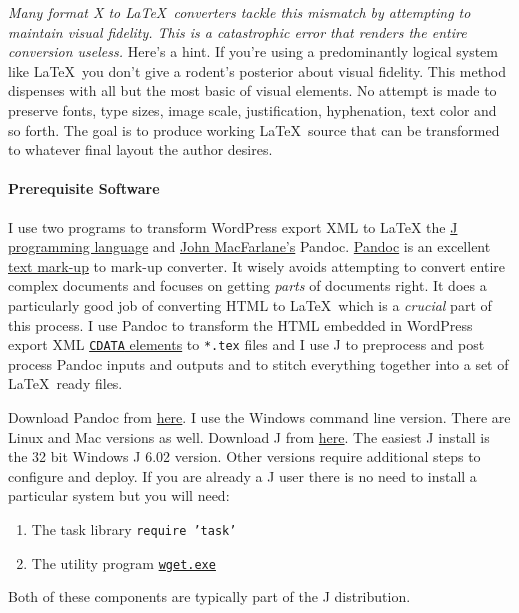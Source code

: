 \emph{Many format X to \LaTeX\ converters tackle this mismatch by
attempting to maintain visual fidelity. This is a catastrophic error
that renders the entire conversion useless.} Here's a hint. If you're
using a predominantly logical system like \LaTeX\ you don't give a
rodent's posterior about visual fidelity. This method dispenses with all
but the most basic of visual elements. No attempt is made to preserve
fonts, type sizes, image scale, justification, hyphenation, text color
and so forth. The goal is to produce working \LaTeX\ source that can be
transformed to whatever final layout the author desires.

\paragraph{Prerequisite Software}

I use two programs to transform WordPress export XML to \LaTeX\: the
\href{http://www.jsoftware.com/}{J programming language} and
\href{http://johnmacfarlane.net/}{John MacFarlane's} Pandoc.
\href{http://johnmacfarlane.net/pandoc/}{Pandoc} is an excellent
\href{http://en.wikipedia.org/wiki/Markup\_language}{text mark-up} to
mark-up converter. It wisely avoids attempting to convert entire complex
documents and focuses on getting \emph{parts} of documents right. It
does a particularly good job of converting HTML to \LaTeX\ which is a
\emph{crucial} part of this process. I use Pandoc to transform the HTML
embedded in WordPress export XML
\href{http://en.wikipedia.org/wiki/CDATA}{\texttt{CDATA} elements} to
\texttt{*.tex} files and I use J to preprocess and post process Pandoc
inputs and outputs and to stitch everything together into a set of \LaTeX\
ready files.

Download Pandoc from
\href{http://johnmacfarlane.net/pandoc/installing.html}{here}. I use the
Windows command line version. There are Linux and Mac versions as well.
Download J from \href{http://www.jsoftware.com/stable.htm}{here}. The
easiest J install is the 32 bit Windows J 6.02 version. Other versions
require additional steps to configure and deploy. If you are already a J
user there is no need to install a particular system but you will need:

\begin{enumerate}
\item
  The task library \texttt{require 'task'}
\item
  The utility program
  \href{http://www.gnu.org/software/wget/}{\texttt{wget.exe}}
\end{enumerate}
Both of these components are typically part of the J distribution.


